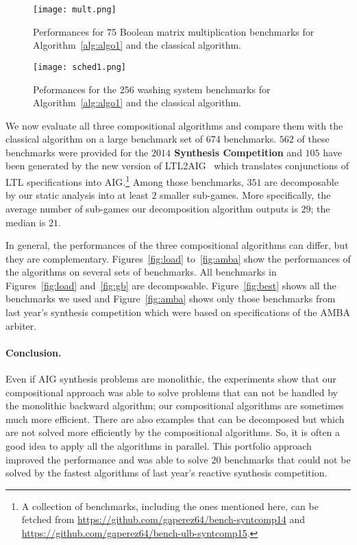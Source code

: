 \documentclass[submission,copyright,creativecommons]{eptcs}
\begin{document}
\begin{figure}[H]
  \begin{minipage}{0.43\textwidth}
    \begin{center}
      \texttt{[image: mult.png]}
      \caption{Performances for 75 Boolean matrix multiplication
        benchmarks for Algorithm~\ref{alg:algo1} and the classical algorithm.
      }
      \label{fig:mult}
    \end{center}
  \end{minipage}
  \qquad
  \begin{minipage}{0.43\textwidth}
    \begin{center}
      \texttt{[image: sched1.png]}
      \caption{Peformances for the 256 washing system benchmarks
      for Algorithm~\ref{alg:algo1} and the classical algorithm.}
      \label{fig:sched}
    \end{center}
  \end{minipage}
\end{figure}

We now evaluate all three compositional algorithms and compare them with the classical
algorithm on a large benchmark set of 674 benchmarks.
$562$ of these benchmarks were provided for the \textbf{$2014$ Synthesis Competition}
and $105$ have been generated by the new version of LTL2AIG~\cite{ltl2aig} which
translates conjunctions of LTL specifications into AIG.\footnote{A collection of benchmarks,
including the ones mentioned here, can be fetched from
\url{https://github.com/gaperez64/bench-syntcomp14}
and \url{https://github.com/gaperez64/bench-ulb-syntcomp15}.}
Among those benchmarks, $351$ are decomposable by our static analysis into at
least $2$ smaller sub-games. More specifically, the average number of sub-games our
decomposition algorithm outputs is $29$; the median is $21$.

In general, the performances of the three compositional algorithms can differ,
but they are complementary.
Figures~\ref{fig:load} to~\ref{fig:amba} show the performances of the algorithms
on several sets of benchmarks. All benchmarks in
Figures~\ref{fig:load} and~\ref{fig:gb} are decomposable.  Figure~\ref{fig:best}
shows all the benchmarks we used and Figure~\ref{fig:amba} shows only those
benchmarks from last year's synthesis competition which were based on
specifications of the \textsf{AMBA} arbiter.


\paragraph{{\bf Conclusion.}} Even if AIG synthesis problems are monolithic, the
experiments show that our compositional approach was able to solve problems that
can not be handled by the monolithic backward algorithm; our compositional
algorithms are sometimes much more efficient. There are also examples that can
be decomposed but which are not solved more efficiently by the compositional
algorithms. So, it is often a good idea to apply all the algorithms in parallel.
This portfolio approach improved the performance and was able to solve 20
benchmarks that could not be solved by
the fastest algorithms of last year's reactive synthesis competition.
\end{document}
